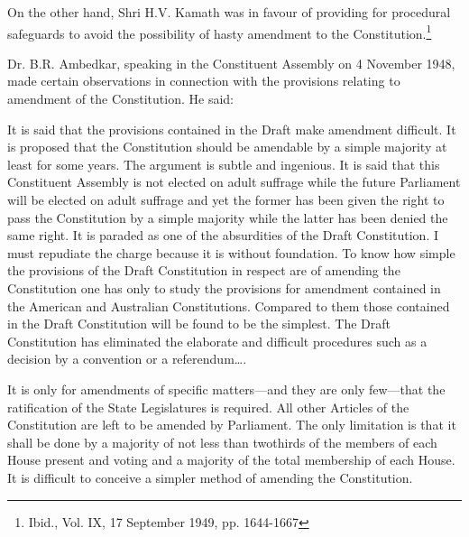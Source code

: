 \begin{multicols}{2}
\noi
On the other hand, Shri H.V. Kamath was in favour of providing for procedural safeguards to
avoid the possibility of hasty amendment to the Constitution.\footnote{Ibid., Vol. IX, 17 September 1949, pp. 1644-1667}

\noi
Dr. B.R. Ambedkar, speaking in the Constituent Assembly on 4 November 1948, made certain
observations in connection with the provisions relating to amendment of the Constitution. He
said:

\noi
It is said that the provisions contained in the Draft make amendment difficult. It is proposed
that the Constitution should be amendable by a simple majority at least for some years. The
argument is subtle and ingenious. It is said that this Constituent Assembly is not elected on
adult suffrage while the future Parliament will be elected on adult suffrage and yet the former
has been given the right to pass the Constitution by a simple majority while the latter has been
denied the same right. It is paraded as one of the absurdities of the Draft Constitution. I must
repudiate the charge because it is without foundation. To know how simple the provisions of
the Draft Constitution in respect are of amending the Constitution one has only to study the
provisions for amendment contained in the American and Australian Constitutions. Compared
to them those contained in the Draft Constitution will be found to be the simplest. The Draft
Constitution has eliminated the elaborate and difficult procedures such as a decision by a
convention or a referendum….

\vspace{-.1cm}

\noi
 It is only for amendments of specific matters—and they are only few—that the ratification of
the State Legislatures is required. All other Articles of the Constitution are left to be amended
by Parliament. The only limitation is that it shall be done by a majority of not less than twothirds of the members of each House present and voting and a majority of the total membership
of each House. It is difficult to conceive a simpler method of amending the Constitution.

\vspace{-.1cm}


\end{multicols}
